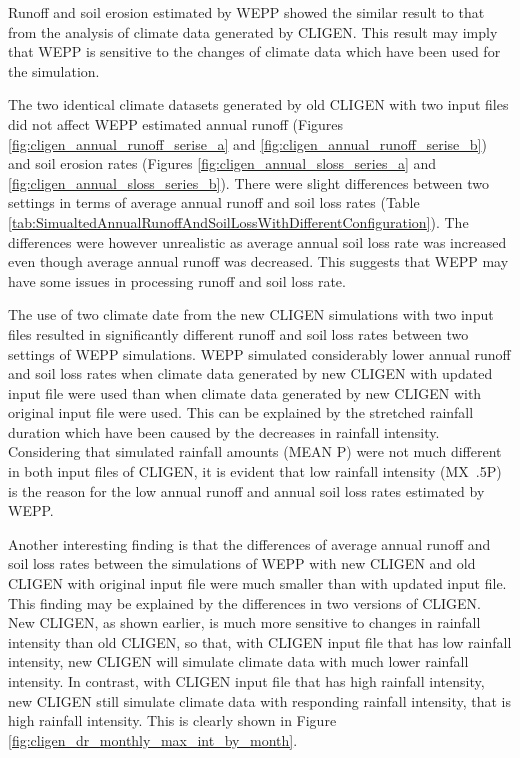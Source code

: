 Runoff and soil erosion estimated by WEPP showed the similar result to that from
the analysis of climate data generated by CLIGEN. This result may imply that
WEPP is sensitive to the changes of climate data which have been used for the
simulation.

The two identical climate datasets generated by old CLIGEN with two input files
did not affect WEPP estimated annual runoff (Figures
\ref{fig:cligen_annual_runoff_serise_a} and
\ref{fig:cligen_annual_runoff_serise_b}) and soil erosion rates (Figures
\ref{fig:cligen_annual_sloss_series_a} and
\ref{fig:cligen_annual_sloss_series_b}).
There were slight differences between two settings in terms of average annual
runoff and soil loss rates (Table
\ref{tab:SimualtedAnnualRunoffAndSoilLossWithDifferentConfiguration}). The
differences were however unrealistic as average annual soil loss rate was
increased even though average annual runoff was decreased. This suggests that
WEPP may have some issues in processing runoff and soil loss rate.

The use of two climate date from the new CLIGEN simulations with two input files
resulted in significantly different runoff and soil loss rates between two
settings of WEPP simulations. WEPP simulated considerably lower annual runoff
and soil loss rates when climate data generated by new CLIGEN with updated input
file were used than when climate data generated by new CLIGEN with original
input file were used. This can be explained by the stretched rainfall duration
which have been caused by the decreases in rainfall intensity. Considering that
simulated rainfall amounts (MEAN P) were not much different in both input files
of CLIGEN, it is evident that low rainfall intensity (MX~.5P) is the reason for
the low annual runoff and annual soil loss rates estimated by WEPP.

Another interesting finding is that the differences of average annual runoff and
soil loss rates between the simulations of WEPP with new CLIGEN and old CLIGEN
with original input file were much smaller than with updated input file. This
finding may be explained by the differences in two versions of CLIGEN. New
CLIGEN, as shown earlier, is much more sensitive to changes in rainfall
intensity than old CLIGEN, so that, with CLIGEN input file that has low rainfall
intensity, new CLIGEN will simulate climate data with much lower rainfall
intensity. In contrast, with CLIGEN input file that has high rainfall intensity,
new CLIGEN still simulate climate data with responding rainfall intensity, that
is high rainfall intensity. This is clearly shown in Figure
\ref{fig:cligen_dr_monthly_max_int_by_month}.

